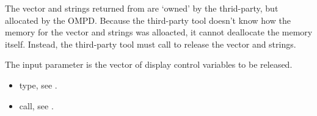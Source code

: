 \descr
The vector and strings returned from 
are `owned' by the thrid-party, but allocated by the OMPD.
Because the third-party tool doesn't know how the memory for the vector
and strings was alloacted, it cannot deallocate the memory itself.
Instead, the third-party tool must call
 to release the vector
and strings.

\argdesc
The input parameter  is the vector of display control variables to be released.

\crossreferences
\begin{itemize}
  \item {} type, see .
	\item {} call, see .
\end{itemize}
